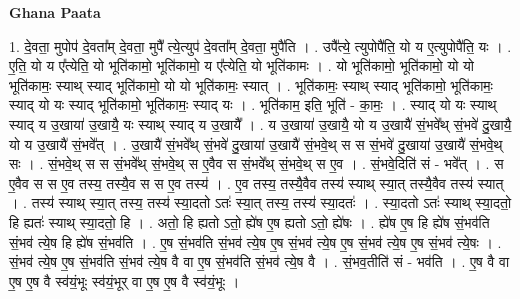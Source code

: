 \documentclass[17pt]{extarticle}
\begin{document}
\textbf{Ghana Paata } \newline

1. दे॒वता॒ मुपोप॑ दे॒वता᳚म् दे॒वता॒ मुपै᳚ त्ये॒त्युप॑ दे॒वता᳚म् दे॒वता॒ मुपै॑ति । . उपै᳚त्ये॒ त्युपोपै॑ति॒ यो य ए॒त्युपोपै॑ति॒ यः । . ए॒ति॒ यो य ए᳚त्येति॒ यो भूति॑कामो॒ भूति॑कामो॒ य ए᳚त्येति॒ यो भूति॑कामः । . यो भूति॑कामो॒ भूति॑कामो॒ यो यो भूति॑कामः॒ स्याथ् स्याद् भूति॑कामो॒ यो यो भूति॑कामः॒ स्यात् । . भूति॑कामः॒ स्याथ् स्याद् भूति॑कामो॒ भूति॑कामः॒ स्याद् यो यः स्याद् भूति॑कामो॒ भूति॑कामः॒ स्याद् यः । . भूति॑काम॒ इति॒ भूति॑ - का॒मः॒ । . स्याद् यो यः स्याथ् स्याद् य उ॒खाया॑ उ॒खायै॒ यः स्याथ् स्याद् य उ॒खायै᳚ । . य उ॒खाया॑ उ॒खायै॒ यो य उ॒खायै॑ सं॒भवे᳚थ् सं॒भवे॑ दु॒खायै॒ यो य उ॒खायै॑ सं॒भवे᳚त् । . उ॒खायै॑ सं॒भवे᳚थ् सं॒भवे॑ दु॒खाया॑ उ॒खायै॑ सं॒भवे॒थ् स स सं॒भवे॑ दु॒खाया॑ उ॒खायै॑ सं॒भवे॒थ् सः । . सं॒भवे॒थ् स स सं॒भवे᳚थ् सं॒भवे॒थ् स ए॒वैव स सं॒भवे᳚थ् सं॒भवे॒थ् स ए॒व । . सं॒भवे॒दिति॑ सं - भवे᳚त् । . स ए॒वैव स स ए॒व तस्य॒ तस्यै॒व स स ए॒व तस्य॑ । . ए॒व तस्य॒ तस्यै॒वैव तस्य॑ स्याथ् स्या॒त् तस्यै॒वैव तस्य॑ स्यात् । . तस्य॑ स्याथ् स्या॒त् तस्य॒ तस्य॑ स्या॒दतो ऽतः॑ स्या॒त् तस्य॒ तस्य॑ स्या॒दतः॑ । . स्या॒दतो ऽतः॑ स्याथ् स्या॒दतो॒ हि ह्यतः॑ स्याथ् स्या॒दतो॒ हि । . अतो॒ हि ह्यतो ऽतो॒ ह्ये॑ष ए॒ष ह्यतो ऽतो॒ ह्ये॑षः । . ह्ये॑ष ए॒ष हि ह्ये॑ष सं॒भव॑ति सं॒भव॑ त्ये॒ष हि ह्ये॑ष सं॒भव॑ति । . ए॒ष सं॒भव॑ति सं॒भव॑ त्ये॒ष ए॒ष सं॒भव॑ त्ये॒ष ए॒ष सं॒भव॑ त्ये॒ष ए॒ष सं॒भव॑ त्ये॒षः । . सं॒भव॑ त्ये॒ष ए॒ष सं॒भव॑ति सं॒भव॑ त्ये॒ष वै वा ए॒ष सं॒भव॑ति सं॒भव॑ त्ये॒ष वै । . सं॒भव॒तीति॑ सं - भव॑ति । . ए॒ष वै वा ए॒ष ए॒ष वै स्व॑यं॒भूः स्व॑यं॒भूर् वा ए॒ष ए॒ष वै स्व॑यं॒भूः । \newline
\end{document}
